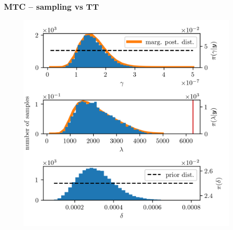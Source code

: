 \subsubsection{MTC --  sampling vs TT}
\begin{figure}[ht!]
	\centering
	\includegraphics{secSIRTMargMargO3Res.png}
	\caption[]{}
	\label{fig:}
\end{figure}
